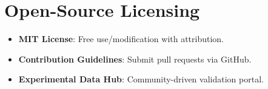 \documentclass[12pt, a4paper]{article}
\begin{document}
\section*{Open-Source Licensing}
\begin{itemize}
\item \textbf{MIT License}: Free use/modification with attribution.
\item \textbf{Contribution Guidelines}: Submit pull requests via GitHub.
\item \textbf{Experimental Data Hub}: Community-driven validation portal.
\end{itemize}



\end{document}
